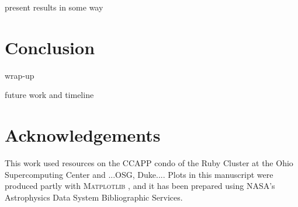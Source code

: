 \documentclass[aps,prd, amsmath,amssymb,superscriptaddress,showkeys,nofootinbib,reprint,preprintnumbers]{revtex4-1}
\begin{document}
present results in some way

\section{Conclusion}\label{sec:conclusion}

wrap-up

future work and timeline

\section*{Acknowledgements}

This work used resources on the CCAPP condo of the Ruby Cluster at the Ohio Supercomputing Center \cite{OhioSupercomputerCenter1987} and ...OSG, Duke.... Plots in this manuscript were produced partly with \textsc{Matplotlib} \cite{Hunter:2007}, and it has been prepared using NASA's Astrophysics Data System Bibliographic Services.




\label{lastpage}
\end{document}
